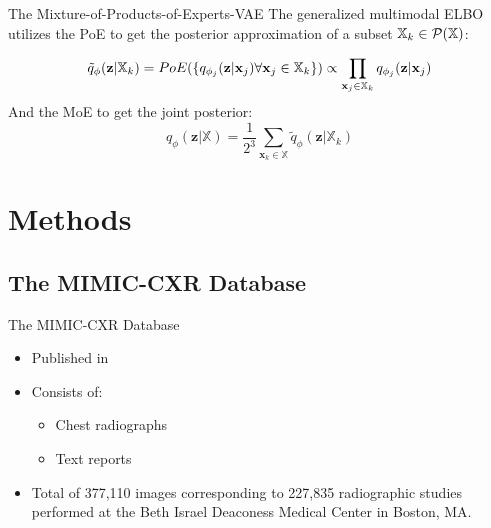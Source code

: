     \begin{frame}{The Mixture-of-Products-of-Experts-VAE}
        The generalized multimodal ELBO utilizes the PoE to get the posterior approximation of a subset $\mathbb{X}_k \in \mathcal{P}(\mathbb{X})$:

        \begin{equation}
            \tilde{q}_{\phi}(\textbf{z}|\mathbb{X}_k)=PoE(\{q_{\phi_j}(\textbf{z}|\textbf{x}_j) \forall \textbf{x}_j \in \mathbb{X}_k\}) \propto \prod _{\textbf{x}_j \in \mathbb{X}_k}q_{\phi_j}(\textbf{z}|\textbf{x}_j)
        \end{equation}
        And the MoE to get the joint posterior:
        \begin{equation}
            q_{\phi}(\textbf{z}|\mathbb{X}) = \frac{1}{2^3} \sum _{\textbf{x}_k \in \mathbb{X}} \tilde{q}_{\phi} (\textbf{z}|\mathbb{X}_k)
        \end{equation}
    \end{frame}

    \begin{frame}[label={mopoe_graph}]


    \end{frame}


    \section{Methods}

    \subsection{The MIMIC-CXR Database}
    \begin{frame}{The MIMIC-CXR Database}
        \begin{itemize}
            \item Published in \cite{johnson2019mimic}
            \item Consists of:
                \begin{itemize}
                    \item Chest radiographs
                    \item Text reports 
                \end{itemize}
            \item Total of 377,110 images corresponding to 227,835 radiographic studies performed at the Beth Israel Deaconess Medical Center in Boston, MA.
        \end{itemize}
    \end{frame}

